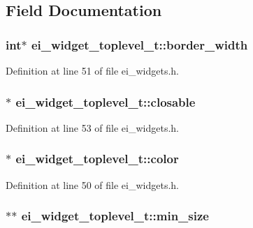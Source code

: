 \subsection{Field Documentation}
\hypertarget{structei__widget__toplevel__t_a0bbd2bde24c317c088f9e9bce9cc951b}{
\subsubsection[{border\-\_\-width}]{\setlength{\rightskip}{0pt plus 5cm}int$\ast$ ei\-\_\-widget\-\_\-toplevel\-\_\-t\-::border\-\_\-width}}\label{structei__widget__toplevel__t_a0bbd2bde24c317c088f9e9bce9cc951b}


Definition at line 51 of file ei\-\_\-widgets.\-h.

\hypertarget{structei__widget__toplevel__t_a809cc88810f816b22028ab993f7b7590}{
\subsubsection[{closable}]{$\ast$ ei\-\_\-widget\-\_\-toplevel\-\_\-t\-::closable}}\label{structei__widget__toplevel__t_a809cc88810f816b22028ab993f7b7590}


Definition at line 53 of file ei\-\_\-widgets.\-h.

\hypertarget{structei__widget__toplevel__t_a5b1efd84c3b1e6598c0fc43ecbf20309}{
\subsubsection[{color}]{$\ast$ ei\-\_\-widget\-\_\-toplevel\-\_\-t\-::color}}\label{structei__widget__toplevel__t_a5b1efd84c3b1e6598c0fc43ecbf20309}


Definition at line 50 of file ei\-\_\-widgets.\-h.

\hypertarget{structei__widget__toplevel__t_a26f1e055e7f494e5609b76d71fc19b3f}{
\subsubsection[{min\-\_\-size}]{$\ast$$\ast$ ei\-\_\-widget\-\_\-toplevel\-\_\-t\-::min\-\_\-size}}\label{structei__widget__toplevel__t_a26f1e055e7f494e5609b76d71fc19b3f}


